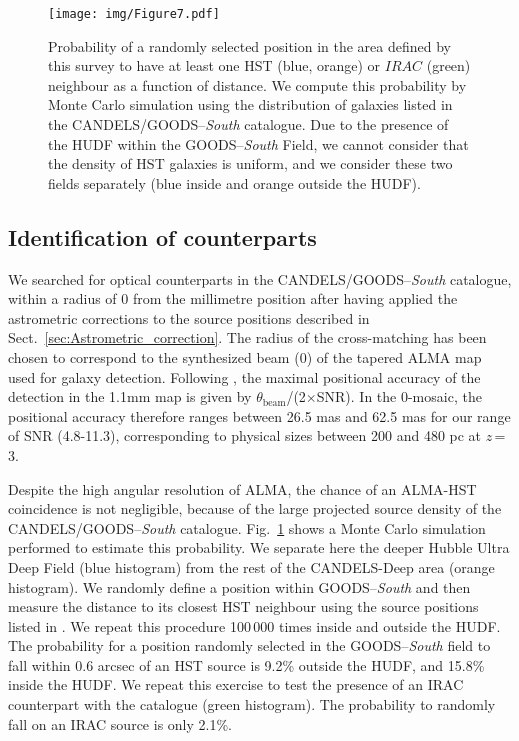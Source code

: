\documentclass[longauth]{aa}
\begin{document}
\begin{figure}
   \centering
   \texttt{[image: img/Figure7.pdf]}
      \caption{Probability of a randomly selected position in the area defined by this survey to have at least one HST (blue, orange) or $IRAC$ (green) neighbour as a function of distance. We compute this probability by Monte Carlo simulation using the distribution of galaxies listed in the CANDELS/GOODS--\textit{South} catalogue. Due to the presence of the HUDF within the GOODS--\textit{South} Field, we cannot consider that the density of HST galaxies is uniform, and we consider these two fields separately (blue inside and orange outside the HUDF).}
         \label{distance_closest_galaxy}
\end{figure}


\subsection{Identification of counterparts}\label{sec:galaxies_identification}
We searched for optical counterparts in the CANDELS/GOODS--\textit{South} catalogue, within a radius of 0 from the millimetre position after having applied the astrometric corrections to the source positions described in Sect.~\ref{sec:Astrometric_correction}. The radius of the cross-matching has been chosen to correspond to the synthesized beam (0) of the tapered ALMA map used for galaxy detection. Following \cite{Condon1997}, the maximal positional accuracy of the detection in the 1.1mm map is given by $\theta_{\text{beam}}$/(2$\times$SNR). In the 0-mosaic, the positional accuracy therefore ranges between 26.5 mas and 62.5 mas for our range of SNR (4.8-11.3), corresponding to physical sizes between 200 and 480 pc  at $z$\,=\,3. 

Despite the high angular resolution of ALMA, the chance of an ALMA-HST coincidence is not negligible, because of the large projected source density of the CANDELS/GOODS--\textit{South} catalogue. Fig.~\ref{distance_closest_galaxy} shows a Monte Carlo simulation performed to estimate this probability. We separate here the deeper Hubble Ultra Deep Field (blue histogram) from the rest of the CANDELS-Deep area (orange histogram). We randomly define a position within GOODS--\textit{South} and then measure the distance to its closest HST neighbour using the source positions listed in \cite{Guo2013}. We repeat this procedure 100\,000 times inside and outside the HUDF. The probability for a position randomly selected in the GOODS--\textit{South} field to fall within 0.6 arcsec of an HST source is 9.2\% outside the HUDF, and 15.8\% inside the HUDF. We repeat this exercise to test the presence of an IRAC counterpart with the \cite{Ashby2015} catalogue (green histogram). The probability to randomly fall on an IRAC source is only 2.1\%. 
\end{document}
